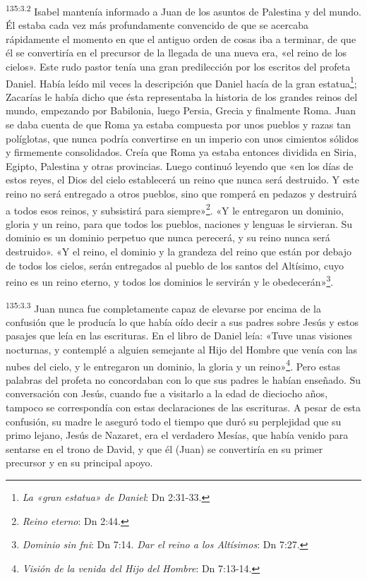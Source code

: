 \par 
\textsuperscript{135:3.2} Isabel mantenía informado a Juan de los asuntos de Palestina y del mundo. Él estaba cada vez más profundamente convencido de que se acercaba rápidamente el momento en que el antiguo orden de cosas iba a terminar, de que él se convertiría en el precursor de la llegada de una nueva era, «el reino de los cielos». Este rudo pastor tenía una gran predilección por los escritos del profeta Daniel. Había leído mil veces la descripción que Daniel hacía de la gran estatua\footnote{\textit{La «gran estatua» de Daniel}: Dn 2:31-33.}; Zacarías le había dicho que ésta representaba la historia de los grandes reinos del mundo, empezando por Babilonia, luego Persia, Grecia y finalmente Roma. Juan se daba cuenta de que Roma ya estaba compuesta por unos pueblos y razas tan políglotas, que nunca podría convertirse en un imperio con unos cimientos sólidos y firmemente consolidados. Creía que Roma ya estaba entonces dividida en Siria, Egipto, Palestina y otras provincias. Luego continuó leyendo que «en los días de estos reyes, el Dios del cielo establecerá un reino que nunca será destruido. Y este reino no será entregado a otros pueblos, sino que romperá en pedazos y destruirá a todos esos reinos, y subsistirá para siempre»\footnote{\textit{Reino eterno}: Dn 2:44.}. «Y le entregaron un dominio, gloria y un reino, para que todos los pueblos, naciones y lenguas le sirvieran. Su dominio es un dominio perpetuo que nunca perecerá, y su reino nunca será destruido». «Y el reino, el dominio y la grandeza del reino que están por debajo de todos los cielos, serán entregados al pueblo de los santos del Altísimo, cuyo reino es un reino eterno, y todos los dominios le servirán y le obedecerán»\footnote{\textit{Dominio sin fni}: Dn 7:14. \textit{Dar el reino a los Altísimos}: Dn 7:27.}.

\par 
\textsuperscript{135:3.3} Juan nunca fue completamente capaz de elevarse por encima de la confusión que le producía lo que había oído decir a sus padres sobre Jesús y estos pasajes que leía en las escrituras. En el libro de Daniel leía: «Tuve unas visiones nocturnas, y contemplé a alguien semejante al Hijo del Hombre que venía con las nubes del cielo, y le entregaron un dominio, la gloria y un reino»\footnote{\textit{Visión de la venida del Hijo del Hombre}: Dn 7:13-14.}. Pero estas palabras del profeta no concordaban con lo que sus padres le habían enseñado. Su conversación con Jesús, cuando fue a visitarlo a la edad de dieciocho años, tampoco se correspondía con estas declaraciones de las escrituras. A pesar de esta confusión, su madre le aseguró todo el tiempo que duró su perplejidad que su primo lejano, Jesús de Nazaret, era el verdadero Mesías, que había venido para sentarse en el trono de David, y que él (Juan) se convertiría en su primer precursor y en su principal apoyo.

